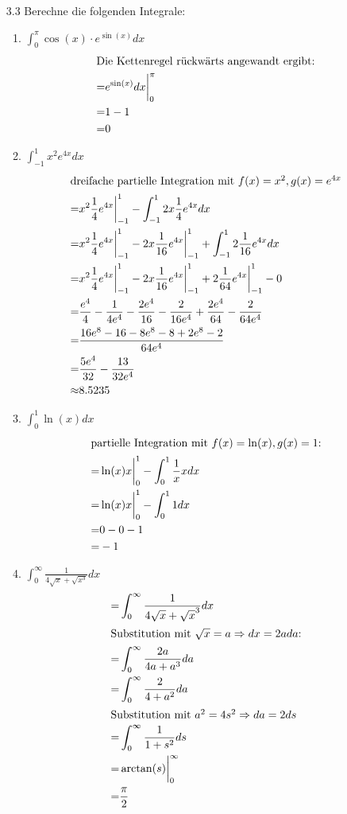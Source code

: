 \documentclass{HM}
\begin{document}
	\begin{enumerate}
		\item[3.3] Berechne die folgenden Integrale:
		\begin{enumerate}
			\item $\int_0^\pi\cos(x)\cdot e^{\sin(x)}dx$
			\begin{align*}
				\intertext{Die Kettenregel rückwärts angewandt ergibt:}
				=&e^{\sin(x)}dx\biggr|_0^\pi\\
				=&1-1\\
				=&0
			\end{align*}
			\item $\int_{-1}^1x^2e^{4x}dx$
			\begin{align*}
				\intertext{dreifache partielle Integration mit $f(x)=x^2, g(x)=e^{4x}$}
				=&x^2\frac{1}{4}e^{4x}\biggr|_{-1}^1 - \int_{-1}^12x\frac{1}{4}e^{4x}dx\\
				=&x^2\frac{1}{4}e^{4x}\biggr|_{-1}^1 - 2x\frac{1}{16}e^{4x}\biggr|_{-1}^1 + \int_{-1}^12\frac{1}{16}e^{4x}dx\\
				=&x^2\frac{1}{4}e^{4x}\biggr|_{-1}^1 - 2x\frac{1}{16}e^{4x}\biggr|_{-1}^1 + 2\frac{1}{64}e^{4x}\biggr|_{-1}^1-0\\
				=&\frac{e^4}{4}-\frac{1}{4e^4}-\frac{2e^4}{16}-\frac{2}{16e^4}+\frac{2e^4}{64}-\frac{2}{64e^4}\\
				=&\frac{16e^8-16-8e^8-8+2e^8-2}{64e^4}	\\
				=&\frac{5e^4}{32}-\frac{13}{32e^4}\\
				\approx& 8.5235
			\end{align*}
			\item $\int_0^1\ln(x)dx$
			\begin{align*}
				\intertext{partielle Integration mit $f(x)=\ln(x), g(x)=1$:}
				=&\ln(x)x\biggr|_0^1 - \int_0^1\frac{1}{x}xdx\\
				=&\ln(x)x\biggr|_0^1 - \int_0^11dx\\
				=&0-0-1\\
				=&-1
			\end{align*}
			\item $\int_0^\infty\frac{1}{4\sqrt{x}+\sqrt{x^3}}dx$
			\begin{align*}
				=&\int_0^\infty\frac{1}{4\sqrt{x}+\sqrt{x}^3}dx\\
				\intertext{Substitution mit $\sqrt{x}=a\Rightarrow dx=2ada$:}
				=&\int_0^\infty\frac{2a}{4a+a^3}da\\
				=&\int_0^\infty\frac{2}{4+a^2}da\\
				\intertext{Substitution mit $a^2=4s^2\Rightarrow da=2ds$}
				=&\int_0^\infty\frac{1}{1+s^2}ds\\
				=&\arctan(s)\biggr|_0^\infty\\
				=&\frac{\pi}{2}
			\end{align*}
		\end{enumerate}
		

\end{enumerate}
\end{document}
